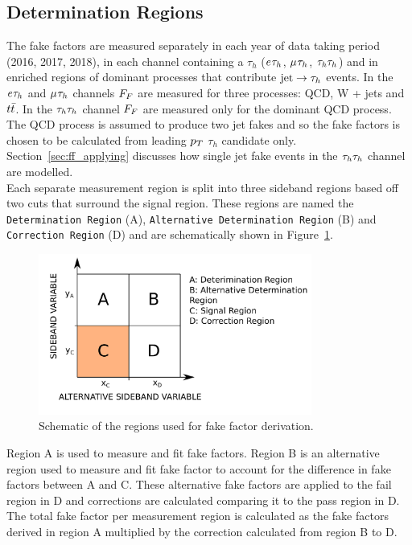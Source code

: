 \subsection{Determination Regions}
\label{sec:ff_dr}

The fake factors are measured separately in each year of data taking period (2016, 2017, 2018), in each channel containing a $\tau_h$ ($e_{}\tau_{h}$, $\mu_{}\tau_{h}$, $\tau_{h}\tau_{h}$) and in enriched regions of dominant processes that contribute $\text{jet}\rightarrow\tau_{h}$ events.
In the $e_{}\tau_{h}$ and $\mu_{}\tau_{h}$ channels $F_{F}$ are measured for three processes: QCD, W + jets and $t\bar{t}$.
In the $\tau_{h}\tau_{h}$ channel $F_{F}$ are measured only for the dominant QCD process.
The QCD process is assumed to produce two jet fakes and so the fake factors is chosen to be calculated from leading $p_{T}$ $\tau_h$ candidate only. 
Section~\ref{sec:ff_applying} discusses how single jet fake events in the $\tau_{h}\tau_{h}$ channel are modelled. \\

Each separate measurement region is split into three sideband regions based off two cuts that surround the signal region.
These regions are named the \texttt{Determination Region} (A), \texttt{Alternative Determination Region} (B) and \texttt{Correction Region} (D) and are schematically shown in Figure~\ref{fig:ff_schematic}. \\

\begin{figure}[!hbtp]
\centering
    \includegraphics[width=0.8\textwidth]{Figures/ff_diagram_v2.pdf}
\caption{Schematic of the regions used for fake factor derivation.}
\label{fig:ff_schematic}
\end{figure}

Region A is used to measure and fit fake factors.
Region B is an alternative region used to measure and fit fake factor to account for the difference in fake factors between A and C.
These alternative fake factors are applied to the fail region in D and corrections are calculated comparing it to the pass region in D.
The total fake factor per measurement region is calculated as the fake factors derived in region A multiplied by the correction calculated from region B to D. \\

